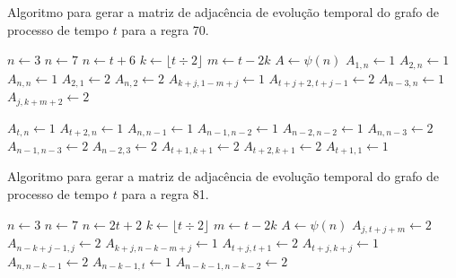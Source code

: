 \documentclass[12pt,a4paper]{article}
\begin{document}
\begin{algorithm}[H]
\caption{Algoritmo para gerar a matriz de adjacência de evolução temporal do
grafo de processo de tempo $t$ para a regra 70.}
\label{alg:r70}
\begin{algorithmic}
    \STATE $n \leftarrow 3$
\ELSE
        \STATE $n \leftarrow 7$
    \ELSE
        \STATE $n \leftarrow t+6$
    \ENDIF
\ENDIF
\STATE $k \leftarrow \lfloor t \div 2 \rfloor$
\STATE $m \leftarrow t - 2k$
\STATE $A \leftarrow \psi(n)$
    \STATE $A_{1,n} \leftarrow 1$
    \STATE $A_{2,n} \leftarrow 1$
    \STATE $A_{n,n} \leftarrow 1$
    \STATE $A_{2,1} \leftarrow 2$
    \STATE $A_{n,2} \leftarrow 2$
\ELSE
            \STATE $A_{k+j,1-m+j} \leftarrow 1$
        \ENDFOR
            \STATE $A_{t+j+2,t+j-1} \leftarrow 2$
        \ENDFOR
        \STATE $A_{n-3,n} \leftarrow 1$
    \ENDIF
        \STATE $A_{j,k+m+2} \leftarrow 2$
    \ENDFOR
{}
\end{algorithmic}
\end{algorithm}

\begin{algorithm}[H]
\begin{algorithmic}
    \STATE $A_{t,n} \leftarrow 1$
    \STATE $A_{t+2,n} \leftarrow 1$
    \STATE $A_{n,n-1} \leftarrow 1$
    \STATE $A_{n-1,n-2} \leftarrow 1$
    \STATE $A_{n-2,n-2} \leftarrow 1$
        \STATE $A_{n,n-3} \leftarrow 2$
        \STATE $A_{n-1,n-3} \leftarrow 2$
        \STATE $A_{n-2,3} \leftarrow 2$
    \ENDIF
    \STATE $A_{t+1,k+1} \leftarrow 2$
    \STATE $A_{t+2,k+1} \leftarrow 2$
    \STATE $A_{t+1,1} \leftarrow 1$
\ENDIF
\end{algorithmic}
\end{algorithm}

\begin{algorithm}[H]
\caption{Algoritmo para gerar a matriz de adjacência de evolução temporal do
grafo de processo de tempo $t$ para a regra 81.}
\label{alg:r81}
\begin{algorithmic}
    \STATE $n \leftarrow 3$
\ELSE
        \STATE $n \leftarrow 7$
    \ELSE
        \STATE $n \leftarrow 2t+2$
    \ENDIF
\ENDIF
\STATE $k \leftarrow \lfloor t \div 2 \rfloor$
\STATE $m \leftarrow t - 2k$
\STATE $A \leftarrow \psi(n)$
        \STATE $A_{j,t+j+m} \leftarrow 2$
        \STATE $A_{n-k+j-1,j} \leftarrow 2$
    \ENDFOR
\ENDIF
{}
    \STATE $A_{k+j,n-k-m+j} \leftarrow 1$
    \STATE $A_{t+j,t+1} \leftarrow 2$
    \STATE $A_{t+j,k+j} \leftarrow 1$
\ENDFOR
\STATE $A_{n,n-k-1} \leftarrow 2$
    \STATE $A_{n-k-1,t} \leftarrow 1$
    \STATE $A_{n-k-1,n-k-2} \leftarrow 2$
\ENDIF
\end{algorithmic}
\end{algorithm}
\end{document}
